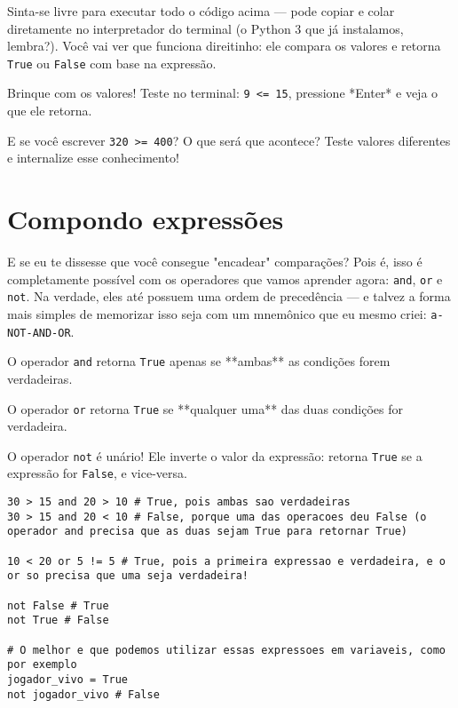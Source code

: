\documentclass[12pt]{book}
\begin{document}
	Sinta-se livre para executar todo o código acima — pode copiar e colar diretamente no interpretador do terminal (o Python 3 que já instalamos, lembra?). Você vai ver que funciona direitinho: ele compara os valores e retorna \verb|True| ou \verb|False| com base na expressão.
	
	\begin{tcolorbox}[colback=gray!10, colframe=black, title={\large\bfseries Dica}]
		Brinque com os valores! Teste no terminal: \texttt{9 <= 15}, pressione *Enter* e veja o que ele retorna.
		
		E se você escrever \texttt{320 >= 400}? O que será que acontece? Teste valores diferentes e internalize esse conhecimento!
	\end{tcolorbox}
	
	\section{Compondo expressões}
	
	E se eu te dissesse que você consegue "encadear" comparações? Pois é, isso é completamente possível com os operadores que vamos aprender agora: \verb*|and|, \verb*|or| e \verb*|not|. Na verdade, eles até possuem uma ordem de precedência — e talvez a forma mais simples de memorizar isso seja com um mnemônico que eu mesmo criei: \verb*|a-NOT-AND-OR|.
	
	O operador \verb*|and| retorna \verb*|True| apenas se **ambas** as condições forem verdadeiras.
	
	O operador \verb*|or| retorna \verb*|True| se **qualquer uma** das duas condições for verdadeira.
	
	O operador \verb*|not| é unário! Ele inverte o valor da expressão: retorna \verb*|True| se a expressão for \verb*|False|, e vice-versa.
	
	\begin{lstlisting}[caption={Operadores lógicos}]
30 > 15 and 20 > 10 # True, pois ambas sao verdadeiras
30 > 15 and 20 < 10 # False, porque uma das operacoes deu False (o operador and precisa que as duas sejam True para retornar True)

10 < 20 or 5 != 5 # True, pois a primeira expressao e verdadeira, e o or so precisa que uma seja verdadeira!

not False # True
not True # False

# O melhor e que podemos utilizar essas expressoes em variaveis, como por exemplo
jogador_vivo = True
not jogador_vivo # False\end{lstlisting}
	
\end{document}
